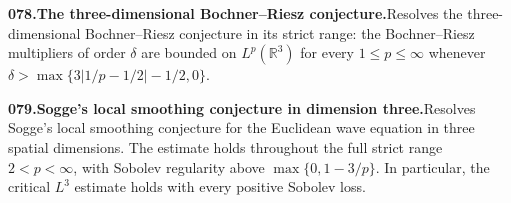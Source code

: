 \documentclass[11pt,a4paper]{article}
\begin{document}
  \par \begin{minipage}{\linewidth}
  \fontsize{10.5}{12.6}\selectfont\RaggedRight
  \hypertarget{result 078}{}
  {\bfseries\textcolor{muted}{078.}\enspace The three-dimensional Bochner--Riesz conjecture.}\enspace Resolves the three-dimensional Bochner--Riesz conjecture in its strict range: the Bochner--Riesz multipliers of order $\delta$ are bounded on $L^p(\mathbb R^3)$ for every $1\le p\le\infty$ whenever $\delta>\max\{3|1/p-1/2|-1/2,0\}$.\par
  \end{minipage}\par\vspace{5pt}



  \par \begin{minipage}{\linewidth}
  \fontsize{10.5}{12.6}\selectfont\RaggedRight
  \hypertarget{result 079}{}
  {\bfseries\textcolor{muted}{079.}\enspace Sogge's local smoothing conjecture in dimension three.}\enspace Resolves Sogge's local smoothing conjecture for the Euclidean wave equation in three spatial dimensions. The estimate holds throughout the full strict range $2<p<\infty$, with Sobolev regularity above $\max\{0,1-3/p\}$. In particular, the critical $L^3$ estimate holds with every positive Sobolev loss.\par
  \end{minipage}\par\vspace{5pt}
\end{document}
